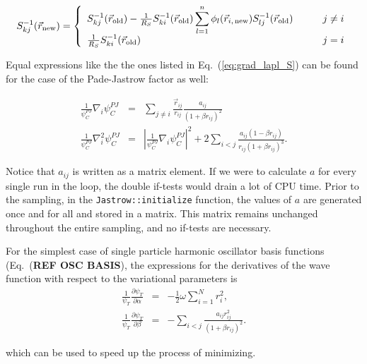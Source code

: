 \begin{eqnarray}
 S^{-1}_{kj}(\vec r_\mathrm{new})  = \left\{ 
\begin{array}{l l}
  S^{-1}_{kj}(\vec r_\mathrm{old}) - \frac{1}{R_S}S^{-1}_{ki}(\vec r_\mathrm{old})\displaystyle\sum_{l=1}^{n} \phi_{l}(\vec r_{i,\,\mathrm{new}})  S^{-1}_{lj}(\vec r_\mathrm{old}) &\qquad \mbox{$j \neq i$} \\
 \frac{1}{R_S}S^{-1}_{ki}(\vec r_\mathrm{old})  &\qquad \mbox{$j=i$}
\end{array} \right.
\label{eq:Update_inv}
\end{eqnarray}


Equal expressions like the the ones listed in Eq.~(\ref{eq:grad_lapl_S}) can be found for the case of the Pade-Jastrow factor as well:

\begin{eqnarray}
 \frac{1}{\psi_C^{PJ}}\nabla_i \psi_C^{PJ} &=& \displaystyle\sum_{j\ne i} \frac{\vec r_{ij}}{r_{ij}}\frac{a_{ij}}{(1+\beta r_{ij})^2} \\
\label{eq:grad_jast}
 \frac{1}{\psi_C^{PJ}}\nabla_i^2 \psi_C^{PJ} &=& \left|\frac{1}{\psi_C^{PJ}}\nabla_i \psi_C^{PJ}\right|^2 + 2\displaystyle\sum_{i < j} \frac{a_{ij}(1 - \beta r_{ij})}{r_{ij}(1 + \beta r_{ij})^3}. \nonumber
\label{eq:lapl_jastrow}
\end{eqnarray}

Notice that $a_{ij}$ is written as a matrix element. If we were to calculate $a$ for every single run in the loop, the double if-tests would drain a lot of CPU time. Prior to the sampling, in the \verb+Jastrow::initialize+ function, the values of $a$ are generated once and for all and stored in a matrix. This matrix remains unchanged throughout the entire sampling, and no if-tests are necessary.

For the simplest case of single particle harmonic oscillator basis functions (Eq.~(\textbf{REF OSC BASIS}), the expressions for the derivatives of the wave function with respect to the variational parameters is
\begin{eqnarray}
\frac{1}{\psi_T}\frac{\partial\psi_T}{\partial\alpha} &=& -\frac{1}{2}\omega\displaystyle\sum_{i=1}^N r_i^2, \\
\frac{1}{\psi_T}\frac{\partial\psi_T}{\partial\beta} &=& -\displaystyle\sum_{i<j}\frac{a_{ij}r_{ij}^2}{(1+\beta r_{ij})^2}.
\label{eq:CGM_derivatives}
\end{eqnarray}

which can be used to speed up the process of minimizing.


